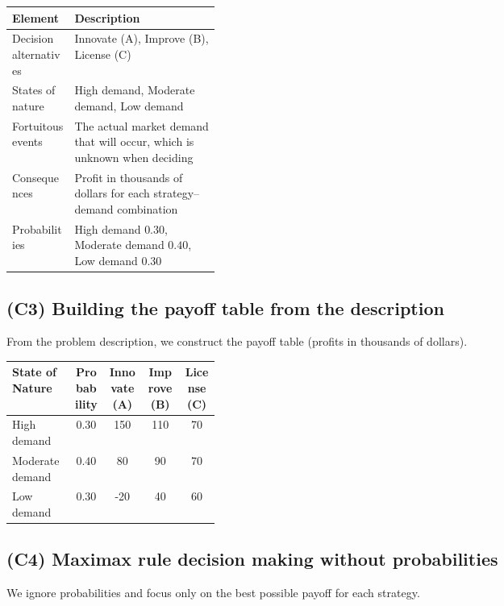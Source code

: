 	\begin{center}
		\begin{tabularx}{\linewidth}{@{}L{0.3\linewidth}Y@{}}
			\toprule
			Element & Description \\
			\midrule
			Decision alternatives & Innovate (A), Improve (B), License (C) \\
			States of nature & High demand, Moderate demand, Low demand \\
			Fortuitous events & The actual market demand that will occur, which is unknown when deciding \\
			Consequences & Profit in thousands of dollars for each strategy--demand combination \\
			Probabilities & High demand \(0.30\), Moderate demand \(0.40\), Low demand \(0.30\) \\
			\bottomrule
		\end{tabularx}
	\end{center}
	
	\subsection{(C3) Building the payoff table from the description}\label{example-1-c3}
	
	From the problem description, we construct the payoff table (profits in thousands of dollars).
	
	\begin{center}
		\begin{tabularx}{\linewidth}{@{}L{0.3\linewidth}C C C C@{}}
			\toprule
			State of Nature & Probability & Innovate (A) & Improve (B) & License (C) \\
			\midrule
			High demand     & \(0.30\) & 150  & 110 & 70 \\
			Moderate demand & \(0.40\) & 80   & 90  & 70 \\
			Low demand      & \(0.30\) & -20  & 40  & 60 \\
			\bottomrule
		\end{tabularx}
	\end{center}
	
	\subsection{(C4) Maximax rule decision making without probabilities}\label{example-1-c4}
	
	We ignore probabilities and focus only on the best possible payoff for each strategy.
	
